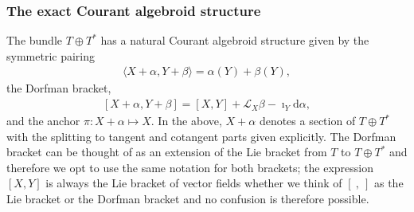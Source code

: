 \documentclass{article}
\newcommand{\TT}{{T\oplus T^*}}
\newcommand{\Lie}{\mathcal{L}}
\newcommand{\ap}{\alpha}
\newcommand{\bt}{\beta}
\newcommand{\rd}{\mathrm{d}}
\newcommand{\brac}{[\ ,\ ]}
\theoremstyle{definition}
\theoremstyle{remark}
\begin{document}
\subsubsection{The exact Courant algebroid structure}
The bundle $\TT$ has a natural Courant algebroid structure given by the symmetric pairing
\begin{align*}
\langle X+\ap,Y+\bt\rangle=\ap(Y)+\bt(Y),
\end{align*}
the Dorfman bracket,
\begin{align}\label{eq:dorfman}
[ X+\ap,Y+\bt]=[X,Y]+\Lie_X\bt-\imath_Y\rd \ap, 
\end{align}
and the anchor $\pi:X+\ap\mapsto X$. In the above, $X+\ap$ denotes a section of $\TT$ with the splitting to tangent and cotangent parts given explicitly. The Dorfman bracket can be thought of as an extension of the Lie bracket from $T$ to $\TT$ and therefore we opt to use the same notation for both brackets; the expression $[X,Y]$ is always the Lie bracket of vector fields whether we think of $\brac$ as the Lie bracket or the Dorfman bracket and no confusion is therefore possible.
\end{document}
